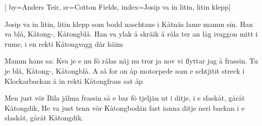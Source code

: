 

[ 		%
	by={Anders Teir},					%
	sr={Cotton Fields},					%
	index={Josip va in litin, litin klepp}]						%
	

\beginverse*						%
Josip va in litin, litin klepp som bodd
naschtans i Kåtnäs lame mamm sin.
Han va blå, Kåtong-, Kåtongblå.
Han va ylak å skräik å råla ter an låg
ivaggon mitt i rume,
i en rekti Kåtongvagg där häim
\endverse							%

\beginverse*						%
Mamm hans sa: Kva je e nu fö rålas
näj nu tror ja nov vi flyttar jag å frassin.
Tu je blå, Kåtong-, Kåtongblå.
A så for on åp motorpede som e schtjitit
streck i Klockarbackan
å in rekti Kåtongfrass sat åp
\endverse							%

\beginverse*						%
Men just vör Bila jälma frassin
så e bar fö tjeljän ut i ditje,
i e slaskåt, gåråt Kåtongdik,
He va just tenn vör Kåtongbodän
fast ianna ditje neri backan
i e slaskåt, gåråt Kåtongdik.
\endverse							%

\endsong							%